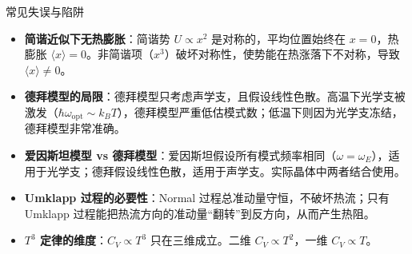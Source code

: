 \begin{errorbox}{常见失误与陷阱}
\begin{itemize}
    \item \textbf{简谐近似下无热膨胀}：简谐势 $U\propto x^2$ 是对称的，平均位置始终在 $x=0$，热膨胀 $\langle x\rangle=0$。非简谐项（$x^3$）破坏对称性，使势能在热涨落下不对称，导致 $\langle x\rangle\neq0$。
    \item \textbf{德拜模型的局限}：德拜模型只考虑声学支，且假设线性色散。高温下光学支被激发（$\hbar\omega_{\text{opt}}\sim k_BT$），德拜模型严重低估模式数；低温下则因为光学支冻结，德拜模型非常准确。
    \item \textbf{爱因斯坦模型 vs 德拜模型}：爱因斯坦假设所有模式频率相同（$\omega=\omega_E$），适用于光学支；德拜假设线性色散，适用于声学支。实际晶体中两者结合使用。
    \item \textbf{Umklapp 过程的必要性}：Normal 过程总准动量守恒，不破坏热流；只有 Umklapp 过程能把热流方向的准动量``翻转''到反方向，从而产生热阻。
    \item \textbf{$T^3$ 定律的维度}：$C_V\propto T^3$ 只在三维成立。二维 $C_V\propto T^2$，一维 $C_V\propto T$。
\end{itemize}
\end{errorbox}

